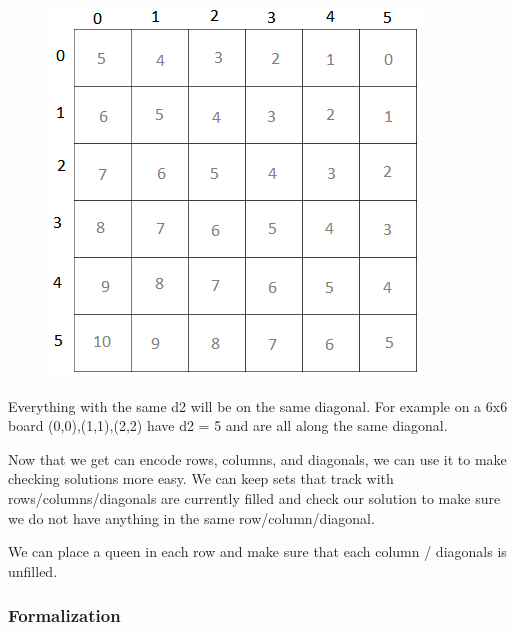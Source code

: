 \documentclass[11pt,oneside]{book}
\makeatletter
\def\maxwidth#1{\ifdim\Gin@nat@width>#1 #1\else\Gin@nat@width\fi}
\makeatother
\begin{document}
\vspace{5px}\begin{figure}[H]\centering
        \includegraphics[width=0.66\maxwidth{\textwidth}]{nqueen2.png}
        \end{figure}

Everything with the same d2 will be on the same diagonal. For example on a 6x6 board (0,0),(1,1),(2,2) have d2 = 5 and are all along the same diagonal.

Now that we get can encode rows, columns, and diagonals, we can use it to make checking solutions more easy. We can keep sets that track with rows/columns/diagonals are currently filled and check our solution to make sure we do not have anything in the same row/column/diagonal.

We can place a queen in each row and make sure that each column / diagonals is unfilled.

\subsubsection{Formalization}
\end{document}
